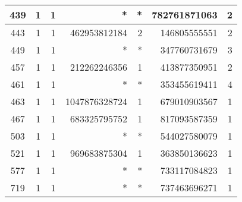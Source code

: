 \documentclass{mcom-l}
\theoremstyle{definition}
\begin{document}
\begin{longtable}[b]{| c | c | c || r | r | r | r |}
\hline
439	& 1	& 1	& *	& *	& 782761871063	& 2\\
\hline
443	& 1	& 1	& 462953812184	& 2	& 146805555551	& 2\\
\hline
449	& 1	& 1	& *	& *	& 347760731679	& 3\\
\hline
457	& 1	& 1	& 212262246356	& 1	& 413877350951	& 2\\
\hline
461	& 1	& 1	& *	& *	& 353455619411	& 4\\
\hline
463	& 1	& 1	& 1047876328724	& 1	& 679010903567	& 1\\
\hline
467	& 1	& 1	& 683325795752	& 1	& 817093587359	& 1\\
\hline
503	& 1	& 1	& *	& *	& 544027580079	& 1\\
\hline
521	& 1	& 1	& 969683875304	& 1	& 363850136623	& 1\\
\hline
577	& 1	& 1	& *	& *	& 733117084823	& 1\\
\hline
719	& 1	& 1	& *	& *	& 737463696271	& 1\\
\end{longtable}
\end{document}
